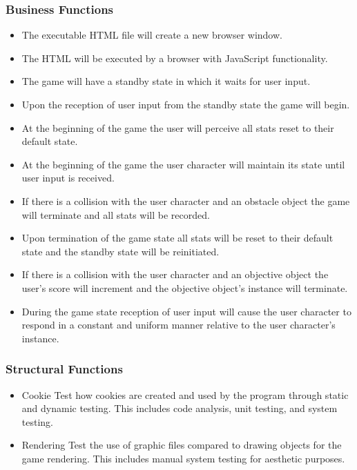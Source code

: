 \documentclass[11pt, oneside]{article}   	%
\begin{document}
\subsubsection*{Business Functions}
\begin{itemize}
\item The executable HTML file will create a new browser window.

\item The HTML will be executed by a browser with JavaScript functionality.

\item The game will have a standby state in which it waits for user input.

\item Upon the reception of user input from the standby state the game will begin.

\item At the beginning of the game the user will perceive all stats reset to their default state.

\item At the beginning of the game the user character will maintain its state until user input is received.

\item If there is a collision with the user character and an obstacle object the game will terminate and all stats will be recorded.

\item Upon termination of the game state all stats will be reset to their default state and the standby state will be reinitiated.

\item If there is a collision with the user character and an objective object the user's score will increment and the objective object's instance will terminate.

\item During the game state reception of user input will cause the user character to respond in a constant and uniform manner relative to the user character's instance.
\end{itemize}

\subsubsection*{Structural Functions}
\begin{itemize}
\item Cookie
\subitem Test how cookies are created and used by the program through static and dynamic testing. This includes code analysis, unit testing, and system testing.

\item Rendering
\subitem Test the use of graphic files compared to drawing objects for the game rendering. This includes manual system testing for aesthetic purposes. 
\end{itemize}
\end{document}
